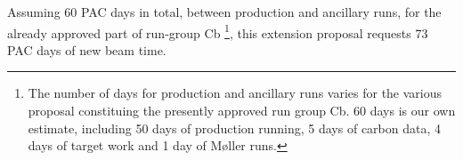 Assuming 60 PAC days in total, between production and ancillary runs, for the already approved part of run-group Cb \footnote{The number of days for production and ancillary runs varies for the various proposal constituing the presently approved run group Cb. 60 days is our own estimate, including 50 days of production running, 5 days of carbon data, 4 days of target work and 1 day of M\o ller runs.}, this extension proposal requests 73 PAC days of new beam time. 
